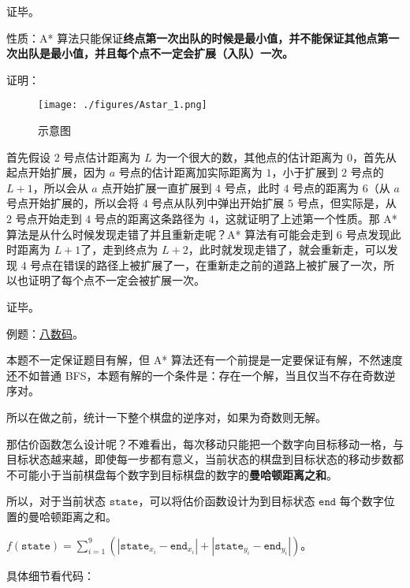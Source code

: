 证毕。

性质：A* 算法只能保证\textbf{终点第一次出队的时候是最小值，并不能保证其他点第一次出队是最小值，并且每个点不一定会扩展（入队）一次。}

证明：

\begin{figure}[ht]
\centering
\texttt{[image: ./figures/Astar\_1.png]}
\caption{示意图} \label{Astar_fig1}
\end{figure}

首先假设 $2$ 号点估计距离为 $L$ 为一个很大的数，其他点的估计距离为 $0$，首先从起点开始扩展，因为 $a$ 号点的估计距离加实际距离为 $1$，小于扩展到 $2$ 号点的 $L + 1$，所以会从 $a$ 点开始扩展一直扩展到 $4$ 号点，此时 $4$ 号点的距离为 $6$（从 $a$ 号点开始扩展的，所以会将 $4$ 号点从队列中弹出开始扩展 $5$ 号点，但实际是，从 $2$ 号点开始走到 $4$ 号点的距离这条路径为 $4$，这就证明了上述第一个性质。那 A* 算法是从什么时候发现走错了并且重新走呢？A* 算法有可能会走到 $6$ 号点发现此时距离为 $L + 1$了，走到终点为 $L + 2$，此时就发现走错了，就会重新走，可以发现 $4$ 号点在错误的路径上被扩展了一，在重新走之前的道路上被扩展了一次，所以也证明了每个点不一定会被扩展一次。 

证毕。

例题：\href{http://poj.org/problem?id=1077}{八数码}。

本题不一定保证题目有解，但 A* 算法还有一个前提是一定要保证有解，不然速度还不如普通 BFS，本题有解的一个条件是：存在一个解，当且仅当不存在奇数逆序对。

所以在做之前，统计一下整个棋盘的逆序对，如果为奇数则无解。

那估价函数怎么设计呢？不难看出，每次移动只能把一个数字向目标移动一格，与目标状态越来越，即使每一步都有意义，当前状态的棋盘到目标状态的移动步数都不可能小于当前棋盘每个数字到目标棋盘的数字的\textbf{曼哈顿距离之和}。

所以，对于当前状态 $\texttt{state}$，可以将估价函数设计为到目标状态 $\texttt{end}$ 每个数字位置的曼哈顿距离之和。

$f(\texttt{state}) = \sum^9_{i = 1}(|\texttt{state}_{x_{i}} - \texttt{end}_{x_{i}}| + |\texttt{state}_{y_{i}} - \texttt{end}_{y_{i}}|)$。

具体细节看代码：

